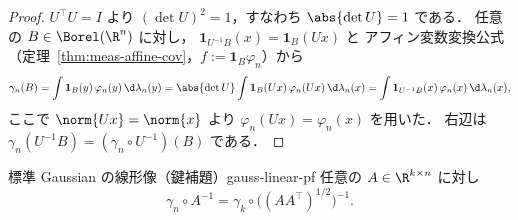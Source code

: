 \begin{proof}
  $U^\top U=I$ より $(\det U)^2=1$，すなわち $\abs{\det U}=1$ である．
  任意の $B\in\Borel(\R^n)$ に対し，
  $\mathbf{1}_{U^{-1}B}(x)=\mathbf{1}_B(Ux)$ と
  アフィン変数変換公式（定理~\ref{thm:meas-affine-cov}，$f:=\mathbf{1}_B\varphi_n$）から
  \[
    \gamma_n(B)
    =\int\mathbf{1}_B(y)\,\varphi_n(y)\,\d\lambda_n(y)
    =\abs{\det U}\int\mathbf{1}_B(Ux)\,\varphi_n(Ux)\,\d\lambda_n(x)
    =\int\mathbf{1}_{U^{-1}B}(x)\,\varphi_n(x)\,\d\lambda_n(x),
  \]
  ここで $\norm{Ux}=\norm{x}$ より $\varphi_n(Ux)=\varphi_n(x)$ を用いた．
  右辺は $\gamma_n(U^{-1}B)=(\gamma_n\circ U^{-1})(B)$ である．
\end{proof}

\begin{lemma}{標準 Gaussian の線形像（鍵補題）}{gauss-linear-pf}
  任意の $A\in\R^{k\times n}$ に対し
  \[
    \gamma_n\circ A^{-1}=\gamma_k\circ\bigl((AA^\top)^{1/2}\bigr)^{-1}.
  \]
\end{lemma}

